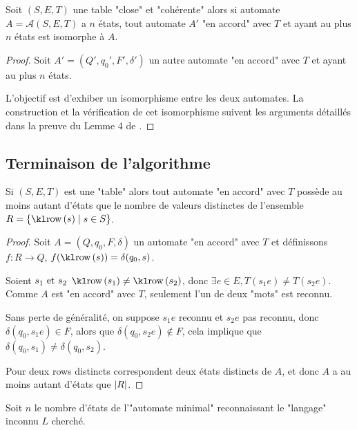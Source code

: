 \begin{lemma}
	Soit $(S,E,T)$ une table "close" et "cohérente" alors si automate $A = \mathcal A (S,E,T)$
	a $n$ états, tout automate $A'$ "en accord" avec $T$ et ayant au plus $n$ états est isomorphe à $A$.
\end{lemma}

\begin{proof}
	Soit $A' = (Q', q_0', F', \delta')$ un autre automate "en accord" avec $T$ et ayant au plus $n$ états.

	L'objectif est d'exhiber un isomorphisme entre les deux automates. La construction et la vérification
	de cet isomorphisme suivent les arguments détaillés dans la preuve du Lemme 4 de \cite{angluinLearning}.
\end{proof}

\subsection{Terminaison de l'algorithme}

\begin{lemma}
	Si $(S,E,T)$ est une "table" alors tout automate "en accord" avec $T$ possède au
	moins autant d'états que le nombre de valeurs distinctes de l'ensemble $R = \setdef {\row s} {s \in S}$.
\end{lemma}

\begin{proof}
	Soit $A = (Q,q_0,F,\delta)$ un automate "en accord" avec $T$ et définissons
	$f: R \to Q$, $f(\row s) = \delta(q_0, s)$.

	Soient $s_1 \text{ et } s_2$ \tq $\row {s_1} \neq \row{s_2}$, donc $\exists e \in E, T(s_1e) \neq T(s_2e)$.
	Comme $A$ est "en accord" avec $T$, seulement l'un de deux "mots" est reconnu.

	Sans perte de généralité, on suppose $s_1e$ reconnu et $s_2e$ pas reconnu, donc
	$\delta (q_0, s_1e) \in F$, alors que $\delta (q_0,s_2e) \notin F$, cela implique que
	$\delta (q_0,s_1) \neq \delta (q_0,s_2)$.


	Pour deux rows distincts correspondent deux états distincts de $A$, et donc $A$ a au moins autant d'états que $\left|R\right|$.
\end{proof}

Soit $n$ le nombre d'états de l'"automate minimal" reconnaissant le "langage" inconnu $L$ cherché.

